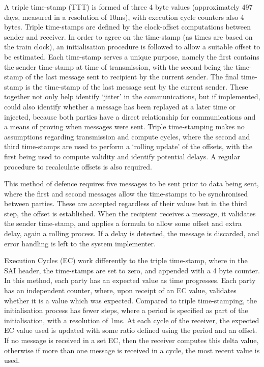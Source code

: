 \documentclass[twoside,11pt,a4paper]{article}
\begin{document}
A triple time-stamp (TTT) is formed of three 4 byte values (approximately 497 days, measured in a resolution of 10ms), with execution cycle counters also 4 bytes. Triple time-stamps are defined by the clock-offset computations between sender and receiver. In order to agree on the time-stamp (as times are based on the train clock), an initialisation procedure is followed to allow a suitable offset to be estimated. Each time-stamp serves a unique purpose, namely the first contains the sender time-stamp at time of transmission, with the second being the time-stamp of the last message sent to recipient by the current sender. The final time-stamp is the time-stamp of the last message sent by the current sender. These together not only help identify `jitter' in the communications, but if implemented, could also identify whether a message has been replayed at a later time or injected, because both parties have a direct relationship for communications and a means of proving when messages were sent. Triple time-stamping makes no assumptions regarding transmission and compute cycles, where the second and third time-stamps are used to perform a `rolling update' of the offsets, with the first being used to compute validity and identify potential delays. A regular procedure to recalculate offsets is also required.

This method of defence requires five messages to be sent prior to data being sent, where the first and second messages allow the time-stamps to be synchronised between parties. These are accepted regardless of their values but in the third step, the offset is established.  When the recipient receives a message, it validates the sender time-stamp, and applies a formula to allow some offset and extra delay, again a rolling process. If a delay is detected, the message is discarded, and error handling is left to the system implementer.

Execution Cycles (EC) work differently to the triple time-stamp, where in the SAI header, the time-stamps are set to zero, and appended with a 4 byte counter. In this method, each party has an expected value as time progresses. Each party has an independent counter, where, upon receipt of an EC value, validates whether it is a value which was expected. Compared to triple time-stamping, the initialisation process has fewer steps, where a period is specified as part of the initialisation, with a resolution of 1ms. At each cycle of the receiver, the expected EC value used is updated with some ratio defined using the period and an offset. If no message is received in a set EC, then the receiver computes this delta value, otherwise if more than one message is received in a cycle, the most recent value is used.
\end{document}
